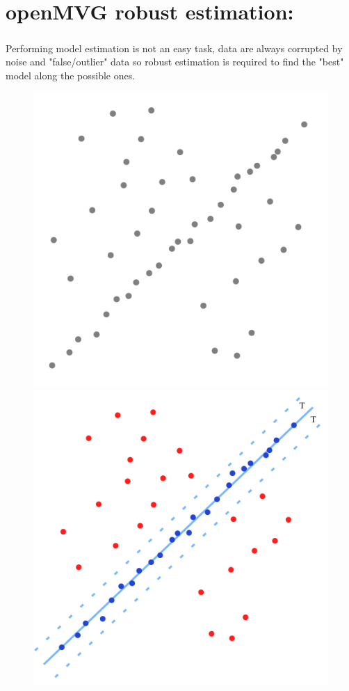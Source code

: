 \documentclass[11pt, letterpaper]{report}
\begin{document}
\chapter{openMVG robust estimation:}

\paragraph{}
Performing model estimation is not an easy task, data are always corrupted by noise and "false/outlier" data so robust estimation is required to find the "best" model along the possible ones.

\begin{figure}[h!]
\begin{center}
\includegraphics[scale=.3]{figures/robust_estimation_line}
\includegraphics[scale=.3]{figures/robust_estimation_fitted_line}

\end{center}
\end{figure}
\end{document}
